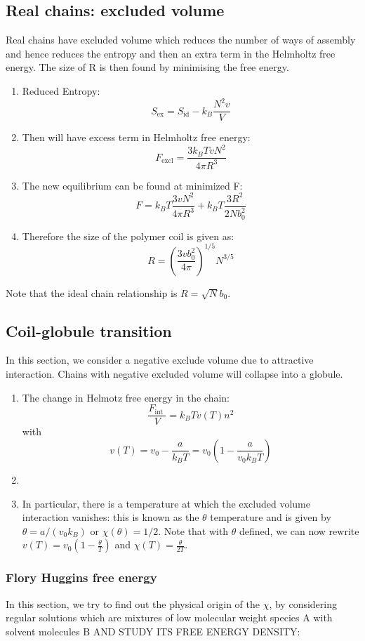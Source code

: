 \documentclass[12pt,a4paper]{article}
\begin{document}
\subsection{Real chains: excluded volume}
Real chains have excluded volume which reduces the number of ways of assembly and hence reduces the entropy and then an extra term in the Helmholtz free energy. The size of R is then found by minimising the free energy.
\begin{enumerate}
    \item Reduced Entropy:
    $$S_{\mathrm{ex}}=S_{\mathrm{id}}-k_B \frac{N^2 v}{V}$$
    \item Then will have excess term in Helmholtz free energy:
    $$F_{\mathrm{excl}}=\frac{3 k_B T v N^2}{4 \pi R^3}$$
    \item The new equilibrium can be found at minimized F:
    $$F=k_B T \frac{3 v N^2}{4 \pi R^3}+k_B T \frac{3 R^2}{2 N b_0^2}$$
    \item Therefore the size of the polymer coil is given as:
    $$
    R=\left(\frac{3 v b_0^2}{4 \pi}\right)^{1 / 5} N^{3 / 5}
    $$
\end{enumerate}
Note that the ideal chain relationship is $R=\sqrt{N} b_0$.
\subsection{Coil-globule transition}
In this section, we consider a negative exclude volume due to attractive interaction. Chains with negative excluded volume will collapse into a globule. 
\begin{enumerate}
    \item The change in Helmotz free energy in the chain:
    $$
    \frac{F_{\text {int }}}{V}=k_B T v(T) n^2
    $$
    with
    $$
    v(T)=v_0-\frac{a}{k_B T}=v_0\left(1-\frac{a}{v_0 k_B T}\right)
    $$
    \item {}
    \item In particular, there is a temperature at which the excluded volume interaction vanishes: this is known as the $\theta$ temperature and is given by $\theta=a /\left(v_0 k_B\right)$ or $\chi(\theta)=1 / 2$. Note that with $\theta$ defined, we can now rewrite $v(T)=v_0\left(1-\frac{\theta}{T}\right)$ and $\chi(T)=\frac{\theta}{2 T}$.
\end{enumerate}
\subsubsection{Flory Huggins free energy
}
In this section, we try to find out the physical origin of the $\chi$, by considering regular solutions which are mixtures of low molecular weight species A with solvent molecules B AND STUDY ITS FREE ENERGY DENSITY:
\end{document}
